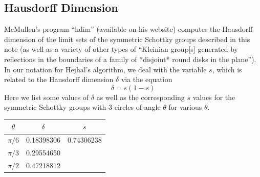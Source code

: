 \documentclass[]{article}
\begin{document}
\subsection*{Hausdorff Dimension}

McMullen's program ``hdim'' (available on his website) computes the Hausdorff dimension of the limit sets of the symmetric Schottky groups described in this note (as well as a variety of other types of ``Kleinian group[s] generated by reflections in the
boundaries of a family of *disjoint* round 
disks in the plane'').
In our notation for Hejhal's algorithm, we deal with the variable $s$, which is related to the Hausdorff dimension $\delta$ via the equation
$$
\delta = s(1 - s)
$$
Here we list some values of $\delta$ as well as the corresponding $s$ values for the symmetric Schottky groups with 3 circles of angle $\theta$ for various $\theta$.
\begin{center}
	\begin{tabular}{c|c|c}
		$\theta$ & $\delta$ & $s$ \\
		\hline
		$\pi/6$ & 0.18398306 & 0.74306238 \\
		$\pi/3$ & 0.29554650 & ~ \\
		$\pi/2$ & 0.47218812 & ~
	\end{tabular}
\end{center}
\end{document}
